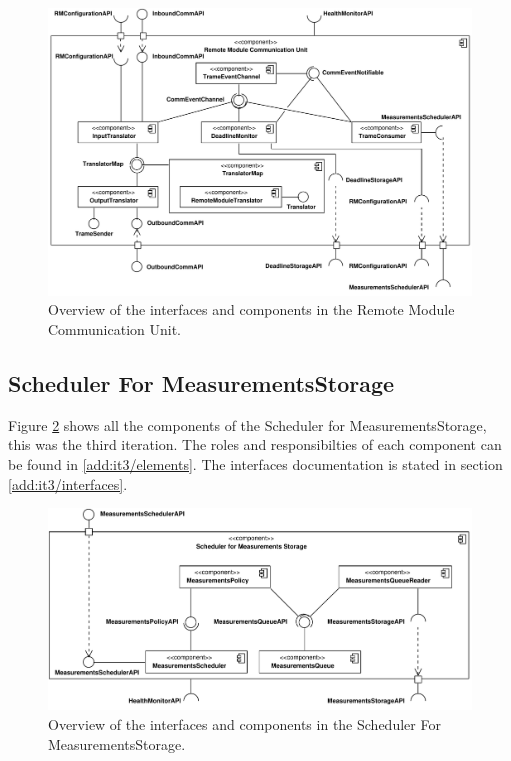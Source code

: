 \begin{figure}[H]
	\begin{centering}
		\includegraphics[width=\textwidth]{figs/add-it2-interfaces.pdf}
		\caption{Overview of the interfaces and components in the Remote
		Module Communication Unit.}
		\label{fig:final-architecture/it2}
	\end{centering}
\end{figure}

\subsection{Scheduler For MeasurementsStorage}

\npar Figure \ref{fig:final-architecture/it3} shows all the components of the
Scheduler for MeasurementsStorage, this was the third iteration. The roles and
responsibilties of each component can be found in \ref{add:it3/elements}. The
interfaces documentation is stated in section \ref{add:it3/interfaces}.

\begin{figure}[H]
	\begin{centering}
		\includegraphics[width=\textwidth]{figs/add-it3-interfaces.pdf}
		\caption{Overview of the interfaces and components in the Scheduler For
		MeasurementsStorage.}
		\label{fig:final-architecture/it3}
	\end{centering}
\end{figure}

